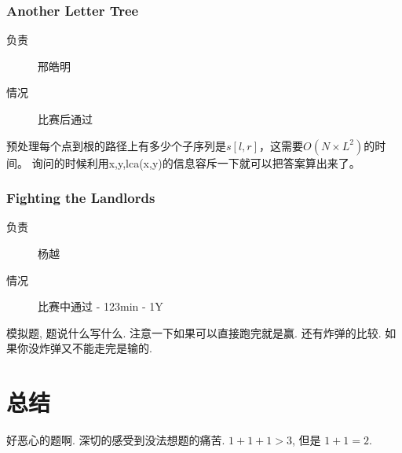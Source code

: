 \documentclass[a4paper, 11pt, nofonts, nocap, fancyhdr]{ctexart}
\newcommand{\problem}[1]{\subsubsection{#1}}
\begin{document}
\problem{Another Letter Tree}

\begin{description}
\item[负责] 邢皓明
\item[情况] 比赛后通过
\end{description}

预处理每个点到根的路径上有多少个子序列是$s[l,r]$，这需要$O(N \times L^2)$的时间。
询问的时候利用x,y,lca(x,y)的信息容斥一下就可以把答案算出来了。

\problem{Fighting the Landlords}

\begin{description}
\item[负责] 杨越
\item[情况] 比赛中通过 - 123min - 1Y
\end{description}

模拟题, 题说什么写什么. 注意一下如果可以直接跑完就是赢. 还有炸弹的比较. 如果你没炸弹又不能走完是输的.

\section{总结}

好恶心的题啊. 深切的感受到没法想题的痛苦. $1 + 1 + 1 > 3$, 但是 $1+1 = 2$. 
\end{document}
